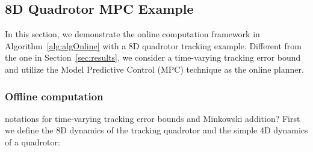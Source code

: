 \subsection{8D Quadrotor MPC Example \label{sec:results}}
%
In this section, we demonstrate the online computation framework in Algorithm~\ref{alg:algOnline} with a 8D quadrotor tracking example. Different from the one in Section~\ref{sec:results}, we consider a time-varying tracking error bound and utilize the Model Predictive Control (MPC) technique as the online planner. 
%
\subsubsection{Offline computation}
\color{blue} notations for time-varying tracking error bounds and Minkowski addition?\color{black}
%
First we define the 8D dynamics of the tracking quadrotor and the simple 4D dynamics of a quadrotor:

